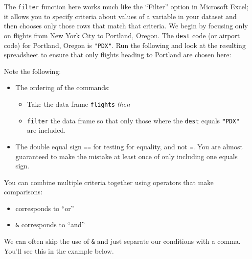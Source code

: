 \documentclass[12pt,]{krantz}
\makeatletter
\newenvironment{Shaded}{\begin{snugshade}}{\end{snugshade}}
\newcommand{\KeywordTok}[1]{\textcolor[rgb]{0.27,0.27,0.27}{\textbf{#1}}}
\newcommand{\StringTok}[1]{\textcolor[rgb]{0.5,0.5,0.5}{#1}}
\newcommand{\OperatorTok}[1]{\textcolor[rgb]{0.43,0.43,0.43}{\textbf{#1}}}
\newcommand{\NormalTok}[1]{#1}
\providecommand{\tightlist}{%
  \setlength{\itemsep}{0pt}\setlength{\parskip}{0pt}}
\newenvironment{kframe}{%
\medskip{}
\setlength{\fboxsep}{.8em}
 \def\at@end@of@kframe{}%
 \ifinner\ifhmode%
  \def\at@end@of@kframe{\end{minipage}}%
  \begin{minipage}{\columnwidth}%
 \fi\fi%
 \def\FrameCommand##1{\hskip\@totalleftmargin \hskip-\fboxsep
 \colorbox{shadecolor}{##1}\hskip-\fboxsep
     \hskip-\linewidth \hskip-\@totalleftmargin \hskip\columnwidth}%
 \MakeFramed {\advance\hsize-\width
   \@totalleftmargin\z@ \linewidth\hsize
   \@setminipage}}%
 {\par\unskip\endMakeFramed%
 \at@end@of@kframe}
\renewenvironment{Shaded}{\begin{kframe}}{\end{kframe}}
\makeatother
\begin{document}
The \texttt{filter} function here works much like the ``Filter'' option
in Microsoft Excel; it allows you to specify criteria about values of a
variable in your dataset and then chooses only those rows that match
that criteria. We begin by focusing only on flights from New York City
to Portland, Oregon. The \texttt{dest} code (or airport code) for
Portland, Oregon is \texttt{"PDX"}. Run the following and look at the
resulting spreadsheet to ensure that only flights heading to Portland
are chosen here:

\begin{Shaded}
\end{Shaded}

Note the following:

\begin{itemize}
\tightlist
\item
  The ordering of the commands:

  \begin{itemize}
  \tightlist
  \item
    Take the data frame \texttt{flights} \emph{then}
  \item
    \texttt{filter} the data frame so that only those where the
    \texttt{dest} equals \texttt{"PDX"} are included.
  \end{itemize}
\item
  The double equal sign \texttt{==} for testing for equality, and not
  \texttt{=}. You are almost guaranteed to make the mistake at least
  once of only including one equals sign.
\end{itemize}

You can combine multiple criteria together using operators that make
comparisons:

\begin{itemize}
\tightlist
\item
  \texttt{\textbar{}} corresponds to ``or''
\item
  \texttt{\&} corresponds to ``and''
\end{itemize}

We can often skip the use of \texttt{\&} and just separate our
conditions with a comma. You'll see this in the example below.
\end{document}
